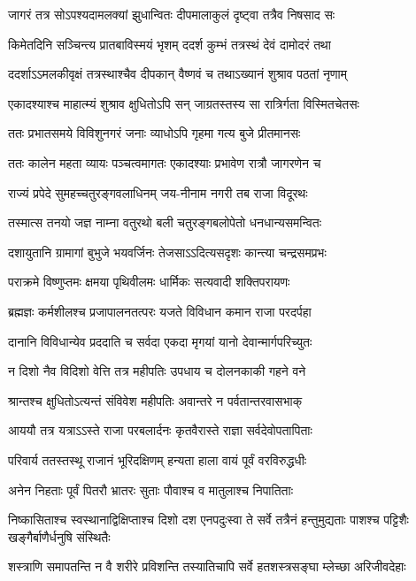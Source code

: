 \twolineshloka
{जागरं तत्र सोऽपश्यदामलक्यां झुधान्वितः}
{दीपमालाकुलं दृष्ट्वा तत्रैव निषसाद सः} %

\twolineshloka
{किमेतदिनि सञ्चिन्त्य प्रातबाविस्मयं भृशम्}
{ददर्श कुम्भं तत्रस्थं देवं दामोदरं तथा} %

\twolineshloka
{ददर्शाऽऽमलकीवृक्षं तत्रस्थाश्चैव दीपकान्}
{वैष्णवं च तथाऽख्यानं शुश्राव पठतां नृणाम्} %

\twolineshloka
{एकादश्याश्च माहात्म्यं शुश्राव क्षुधितोऽपि सन्}
{जाग्रतस्तस्य सा रात्रिर्गता विस्मितचेतसः} %

\twolineshloka
{ततः प्रभातसमये विविशुनगरं जनाः}
{व्याधोऽपि गृहमा गत्य बुजे प्रीतमानसः} %

\twolineshloka
{ततः कालेन महता व्यायः पञ्चत्वमागतः}
{एकादश्याः प्रभावेण रात्रौ जागरणेन च} %

\twolineshloka
{राज्यं प्रपेदे सुमहच्चतुरङ्गवलाधिनम्}
{जय-नीनाम नगरी तब राजा विदूरथः} %

\twolineshloka
{तस्मात्स तनयो जज्ञ नाम्ना वतुरथो बली}
{चतुरङ्गबलोपेतो धनधान्यसमन्वितः} %

\twolineshloka
{दशायुतानि ग्रामागां बुभुजे भयवर्जिनः}
{तेजसाऽऽदित्यसदृशः कान्त्या चन्द्रसमप्रभः} %

\twolineshloka
{पराक्रमे विष्णुप्तमः क्षमया पृथिवीलमः}
{धार्मिकः सत्यवादी शक्तिपरायणः} %

\twolineshloka
{ब्रह्मज्ञः कर्मशीलश्च प्रजापालनतत्परः}
{यजते विविधान कमान राजा परदर्पहा} %

\twolineshloka
{दानानि विविधान्येव प्रददाति च सर्वदा}
{एकदा मृगयां यानो देवान्मार्गपरिच्युतः} %

\twolineshloka
{न दिशो नैव विदिशो वेत्ति तत्र महीपतिः}
{उपधाय च दोलनकाकी गहने वने} %

\twolineshloka
{श्रान्तश्च क्षुधितोऽत्यन्तं संविवेश महीपतिः}
{अवान्तरे न पर्वतान्तरवासभाक्} %

\twolineshloka
{आययौ तत्र यत्राऽऽस्ते राजा परबलार्दनः}
{कृतवैरास्ते राज्ञा सर्वदेवोपतापिताः} %

\twolineshloka
{परिवार्य ततस्तस्थू राजानं भूरिदक्षिणम्}
{हन्यता हाला वायं पूर्वं वरविरुद्धधीः} %

\twolineshloka
{अनेन निहताः पूर्वं पितरौ भ्रातरः सुताः}
{पौवाश्च व मातुलाश्च निपातिताः} %


\threelineshloka
{निष्कासिताश्च स्वस्थानाद्विक्षिप्ताश्च दिशो दश}
{एनपदुःस्वा ते सर्वे तत्रैनं हन्तुमुद्यताः}
{पाशश्च पट्टिशैः खङ्गैर्बाणैर्धनुषि संस्थितैः} %

\twolineshloka
{शस्त्राणि समापतन्ति न वै शरीरे प्रविशन्ति}
{तस्यातिचापि सर्वे हतशस्त्रसङ्घा म्लेच्छा अरिजीवदेहाः} %

